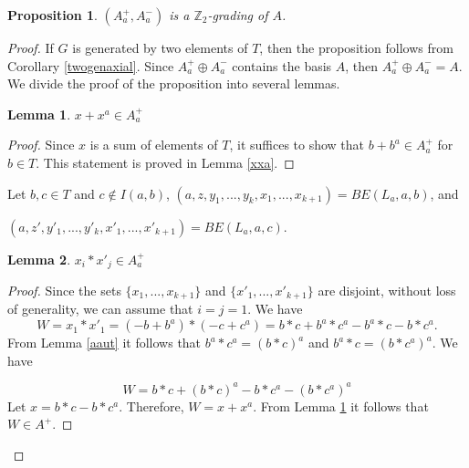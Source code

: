 \documentclass[12pt]{article}
\newcommand\F{\mathbb{F}}
\newcommand\Z{\mathbb{Z}}
\newtheorem{lem}{Lemma}
\newtheorem{prop}{Proposition}
\begin{document}
\begin{prop}\label{twograd}
 $(A_a^+,A_a^-)$ is a $\Z_2$-grading of $A$. 
\end{prop}	
\begin{proof}
	If $G$ is generated by two elements of $T$, then the proposition follows from Corollary \ref{twogenaxial}. 
    Since $A_a^+\oplus A_a^-$ contains the basis $A$, then $A_a^+\oplus A_a^-=A$. We divide the proof of the proposition into several lemmas.
    
	\begin{lem}\label{xxagen}
		$x+x^a\in A^+_a$
	\end{lem}
	\begin{proof}
	Since $x$ is a sum of elements of $T$, it suffices to show that $b+b^a\in A^+_a$ for $b\in T$. This statement is proved in Lemma \ref{xxa}.
\end{proof}
	
	Let $b,c\in T$ and $c\not \in I(a,b)$, 
    $(a,z, y_1,...,y_k, x_1,...,x_{k+1})=BE(L_a, a, b)$, and
    
    $(a, z', y'_1,...,y'_k, x'_1,...,x'_{k+1})=BE(L_a, a, c)$.
		
	\begin{lem}
	$x_i*x'_j\in A^+_a$
	\end{lem}
	\begin{proof}
	

	Since the sets $\{x_1,...,x_{k+1}\}$ and $\{x'_1,...,x'_{k+1}\}$ are disjoint, without loss of generality, we can assume that $i=j=1$.
	We have
	$$W=x_1*x'_1=(-b+b^a)*(-c+c^a)=b*c+ b^a*c^a-b^a*c-b*c^a.$$
	From Lemma \ref{aaut} it follows that $b^a*c^a=(b*c)^a$ and $b^a*c=(b*c^a)^a$. We have
	
	
	$$W=b*c+(b*c)^a-b*c^a -(b*c^a)^a$$
	Let $x=b*c-b*c^a$. Therefore, $W=x+x^a$.
	From Lemma \ref{xxagen} it follows that $W\in A^+$.
	

\end{proof}
\end{proof}
\end{document}
